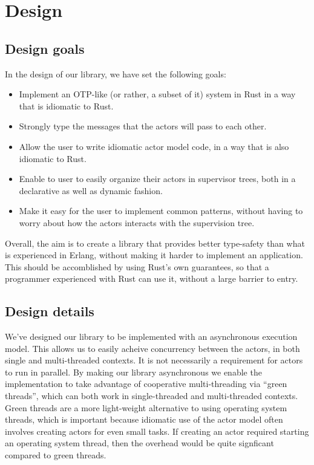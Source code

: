 \documentclass[a4paper]{article}
\begin{document}
\section{Design}
\subsection{Design goals}
In the design of our library, we have set the following goals:
\begin{itemize}
\item Implement an OTP-like (or rather, a subset of it) system in Rust in a way
  that is idiomatic to Rust.
\item Strongly type the messages that the actors will pass to each other.
\item Allow the user to write idiomatic actor model code, in a way that is also
  idiomatic to Rust.
\item Enable to user to easily organize their actors in supervisor trees, both
  in a declarative as well as dynamic fashion.
\item Make it easy for the user to implement common patterns, without having to
  worry about how the actors interacts with the supervision tree.
\end{itemize}

\noindent
Overall, the aim is to create a library that provides better type-safety than
what is experienced in Erlang, without making it harder to implement an
application. This should be accomblished by using Rust's own guarantees, so that
a programmer experienced with Rust can use it, without a large barrier to entry.

\subsection{Design details}
We've designed our library to be implemented with an asynchronous execution
model. This allows us to easily acheive concurrency between the actors, in both
single and multi-threaded contexts. It is not necessarily a requirement for
actors to run in parallel. By making our library asynchronous we enable the
implementation to take advantage of cooperative multi-threading via ``green
threads'', which can both work in single-threaded and multi-threaded contexts.
Green threads are a more light-weight alternative to using operating system
threads, which is important because idiomatic use of the actor model often
involves creating actors for even small tasks. If creating an actor required
starting an operating system thread, then the overhead would be quite signficant
compared to green threads.\\
\end{document}
